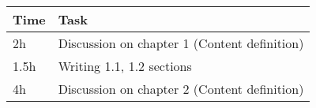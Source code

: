 \begin{center}
    {\renewcommand{\arraystretch}{2}%
    \begin{tabular}{L{2cm}L{12cm}}
        \hline
        \textbf{Time} & \textbf{Task} \\
        \hline
        2h & Discussion on chapter 1 (Content definition) \\
        \hline
        1.5h & Writing 1.1, 1.2 sections \\
        \hline
        4h & Discussion on chapter 2 (Content definition) \\
        \hline
    \end{tabular}}
\end{center}